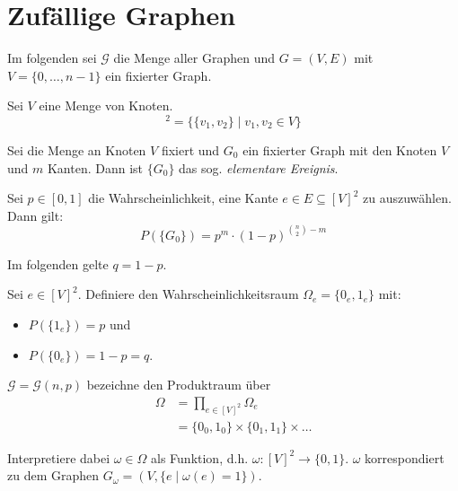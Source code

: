 \chapter{Zufällige Graphen}

Im folgenden sei $ \mathcal{G} $ die Menge aller Graphen und $ G = (V, E) $ mit $ V = \{ 0, \dots, n - 1 \} $ ein fixierter Graph.

\begin{definition}
    Sei $ V $ eine Menge von Knoten.
    \begin{equation*}
        [V]^2 = \{ \{ v_1, v_2 \} \mid v_1, v_2 \in V \}
    \end{equation*}
\end{definition}

\begin{definition}
    Sei die Menge an Knoten $ V $ fixiert und $ G_0 $ ein fixierter Graph mit den Knoten $ V $ und $ m $ Kanten.
    Dann ist $ \{ G_0 \} $ das sog. \textit{elementare Ereignis}.

    Sei $ p \in [0, 1]$ die Wahrscheinlichkeit, eine Kante $ e \in E \subseteq [V]^2 $ zu auszuwählen.
    Dann gilt:
    \begin{equation*}
        P(\{ G_0 \}) = p^m \cdot (1 - p)^{\binom{n}{2} - m}
    \end{equation*}
\end{definition}

Im folgenden gelte $ q = 1 - p $.

\begin{definition}
    Sei $ e \in [V]^2 $.
    Definiere den Wahrscheinlichkeitsraum $ \Omega_e = \{ 0_e, 1_e \} $ mit:
    \begin{itemize}
        \item $ P(\{ 1_e \}) = p $ und
        \item $ P(\{ 0_e \}) = 1 - p = q $.
    \end{itemize}
\end{definition}

\begin{definition}
    $ \mathcal{G} = \mathcal{G}(n, p) $ bezeichne den Produktraum über
    \begin{align*}
        \Omega &= \prod_{e \in [V]^2} \Omega_e \\
        &= \{ 0_0, 1_0 \} \times \{ 0_1, 1_1 \} \times \dots
    \end{align*}

    Interpretiere dabei $ \omega \in \Omega $ als Funktion, d.h. $ \omega : [V]^2 \rightarrow \{ 0, 1 \} $.
    $ \omega $ korrespondiert zu dem Graphen $ G_\omega = (V, \{ e \mid \omega(e) = 1 \}) $.
\end{definition}

